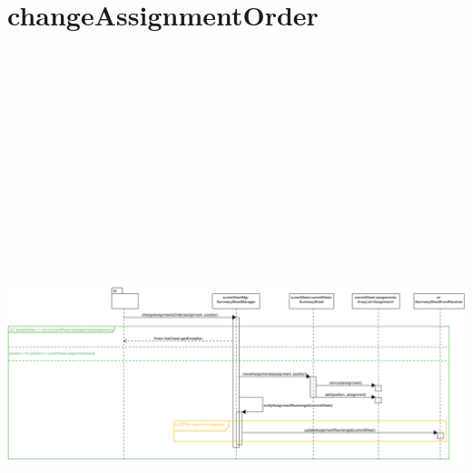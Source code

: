\section{changeAssignmentOrder}
\centering\includegraphics[max width=\textwidth, max height=190mm]{../resources/img/GCC/DSD/op3.png}

